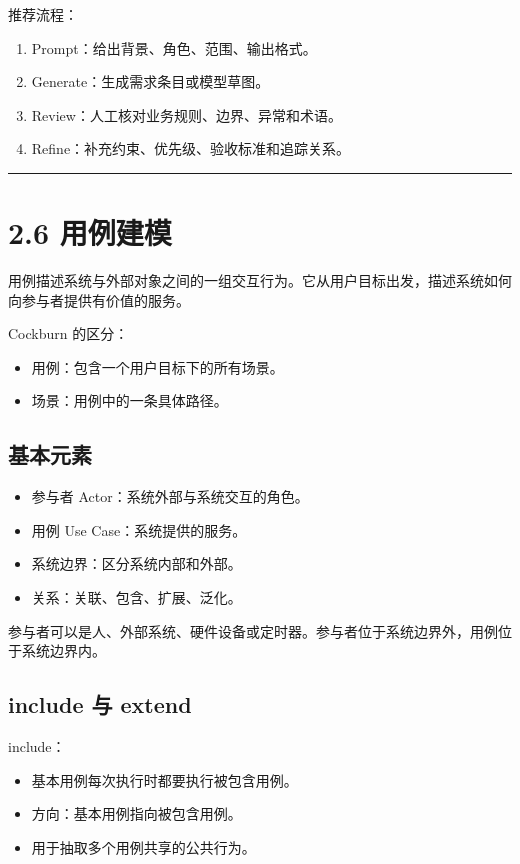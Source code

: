 \documentclass[UTF8,zihao=-4]{ctexart}
\begin{document}
推荐流程：

\begin{enumerate}
\item Prompt：给出背景、角色、范围、输出格式。
\item Generate：生成需求条目或模型草图。
\item Review：人工核对业务规则、边界、异常和术语。
\item Refine：补充约束、优先级、验收标准和追踪关系。
\end{enumerate}

\bigskip\hrule\bigskip

\section{2.6 用例建模}

用例描述系统与外部对象之间的一组交互行为。它从用户目标出发，描述系统如何向参与者提供有价值的服务。

Cockburn 的区分：

\begin{itemize}
\item 用例：包含一个用户目标下的所有场景。
\item 场景：用例中的一条具体路径。
\end{itemize}

\subsection{基本元素}

\begin{itemize}
\item 参与者 Actor：系统外部与系统交互的角色。
\item 用例 Use Case：系统提供的服务。
\item 系统边界：区分系统内部和外部。
\item 关系：关联、包含、扩展、泛化。
\end{itemize}

参与者可以是人、外部系统、硬件设备或定时器。参与者位于系统边界外，用例位于系统边界内。

\subsection{include 与 extend}

include：

\begin{itemize}
\item 基本用例每次执行时都要执行被包含用例。
\item 方向：基本用例指向被包含用例。
\item 用于抽取多个用例共享的公共行为。
\end{itemize}
\end{document}
